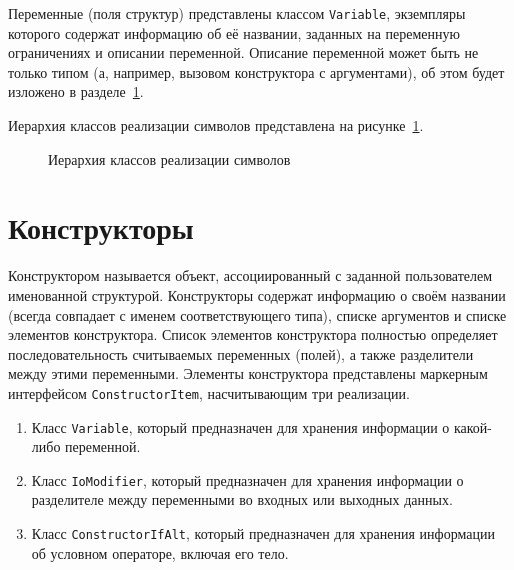 \documentclass[times,specification,annotation]{style/itmo-student-thesis/itmo-student-thesis}
\begin{document}
Переменные (поля структур) представлены классом \texttt{Variable}, экземпляры которого содержат информацию об её названии, заданных на переменную ограничениях и описании переменной. Описание переменной может быть не только типом (а, например, вызовом конструктора с аргументами), об этом будет изложено в разделе~\ref{constructors-section}.

Иерархия классов реализации символов представлена на рисунке~\ref{symbol-classes-hierarchy}.

\begin{figure}[!h]
\caption{Иерархия классов реализации символов}\label{symbol-classes-hierarchy}
\centering
{}%

\end{figure}

\section{Конструкторы}\label{constructors-section}

Конструктором называется объект, ассоциированный с заданной пользователем именованной структурой. Конструкторы содержат информацию о своём названии (всегда совпадает с именем соответствующего типа), списке аргументов и списке элементов конструктора. Список элементов конструктора полностью определяет последовательность считываемых переменных (полей), а также разделители между этими переменными. Элементы конструктора представлены маркерным интерфейсом \texttt{ConstructorItem}, насчитывающим три реализации.

\begin{enumerate}[leftmargin=1.75cm]
    \item Класс \texttt{Variable}, который предназначен для хранения информации о какой-либо переменной.
    \item Класс \texttt{IoModifier}, который предназначен для хранения информации о разделителе между переменными во входных или выходных данных.
    \item Класс \texttt{ConstructorIfAlt}, который предназначен для хранения информации об условном операторе, включая его тело.
\end{enumerate}
\end{document}
